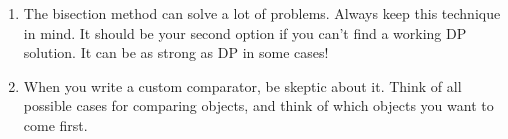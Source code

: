 \documentclass[12pt]{book}
\begin{document}
\begin{enumerate}[label = \roman*.]
\item The bisection method can solve a lot of problems. Always keep this technique in mind. It should be your second option if you can't find a working DP solution. It can be as strong as DP in some cases!
\item When you write a custom comparator, be skeptic about it. Think of all possible cases for comparing objects, and think of which objects you want to come first.
\end{enumerate}
\end{document}
